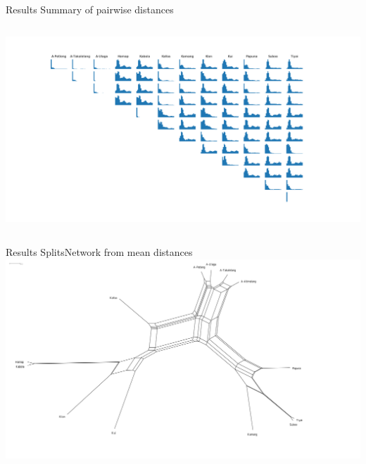 \documentclass[
10pt,
]{beamer}
\begin{document}
\begin{frame}{Results}
  Summary of pairwise distances
  \begin{columns}
    \begin{column}{1.2\textwidth}
      \includegraphics[clip, trim=2.5cm 1.5cm 2.5cm 1.5cm, width=\textwidth]{pairwise_distances}
    \end{column}
  \end{columns}
\end{frame}
\begin{frame}{Results}
  SplitsNetwork from mean distances
  \includegraphics[width=\textwidth]{distances}
\end{frame}
\end{document}
